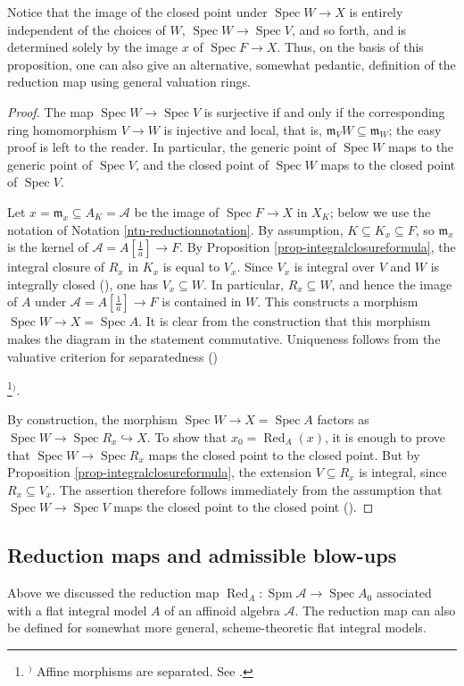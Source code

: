 \documentclass[a4paper,12pt, dvipdfmx]{jsbook}
\def\m{\mathfrak{m}}
\def\Red{\mathop{\mathrm{Red}}\nolimits}
\def\Spec{\mathop{\mathrm{Spec}}\nolimits}
\def\Spm{\mathop{\mathrm{Spm}}\nolimits}
\theoremstyle{plain}
\theoremstyle{definition}
\newcounter{chushaku}
\def\chu#1{\addtocounter{chushaku}{1}\footnote[\value{chushaku}]{${}^)$ #1}${}^)$}
\begin{document}
Notice that the image of the closed point under $\Spec W\rightarrow X$ is entirely independent of the choices of $W$, $\Spec W\rightarrow\Spec V$, and so forth, and is determined solely by the image $x$ of $\Spec F\rightarrow X$.
Thus, on the basis of this proposition, one can also give an alternative, somewhat pedantic, definition of the reduction map using general valuation rings.
\begin{proof}[Proof]
The map $\Spec W\rightarrow\Spec V$ is surjective if and only if the corresponding ring homomorphism $V\rightarrow W$ is injective and local, that is, $\m_VW\subseteq\m_W$; the easy proof is left to the reader.
In particular, the generic point of $\Spec W$ maps to the generic point of $\Spec V$, and the closed point of $\Spec W$ maps to the closed point of $\Spec V$.

Let $x=\m_x\subseteq A_K=\mathcal{A}$ be the image of $\Spec F\rightarrow X$ in $X_K$; below we use the notation of Notation \ref{ntn-reductionnotation}.
By assumption, $K\subseteq K_x\subseteq F$, so $\m_x$ is the kernel of $\mathcal{A}=A[\frac{1}{a}]\rightarrow F$.
By Proposition \ref{prop-integralclosureformula}, the integral closure of $R_x$ in $K_x$ is equal to $V_x$. Since $V_x$ is integral over $V$ and $W$ is integrally closed (\cite[Prop.\ 5.18]{AM}), one has $V_x\subseteq W$.
In particular, $R_x\subseteq W$, and hence the image of $A$ under $\mathcal{A}=A[\frac{1}{a}]\rightarrow F$ is contained in $W$. This constructs a morphism $\Spec W\rightarrow X=\Spec A$.
It is clear from the construction that this morphism makes the diagram in the statement commutative.
Uniqueness follows from the valuative criterion for separatedness (\cite[Chap.\ II, Theorem 4.3]{Hart2})\chu{Affine morphisms are separated. See \cite[Chap.\ II, Exercise 5.17 (b)]{Hart2}.}.

By construction, the morphism $\Spec W\rightarrow X=\Spec A$ factors as $\Spec W\rightarrow\Spec R_x\hookrightarrow X$.
To show that $x_0=\Red_A(x)$, it is enough to prove that $\Spec W\rightarrow\Spec R_x$ maps the closed point to the closed point.
But by Proposition \ref{prop-integralclosureformula}, the extension $V\subseteq R_x$ is integral, since $R_x\subseteq V_x$. The assertion therefore follows immediately from the assumption that $\Spec W\rightarrow\Spec V$ maps the closed point to the closed point (\cite[Cor.\ 5.8]{AM}).
\end{proof}

\subsection{Reduction maps and admissible blow-ups}\label{sub-admissibleblowupreductionmap}
Above we discussed the reduction map $\Red_A\colon\Spm\mathcal{A}\rightarrow\Spec A_0$ associated with a flat integral model $A$ of an affinoid algebra $\mathcal{A}$. The reduction map can also be defined for somewhat more general, scheme-theoretic flat integral models.
\end{document}
